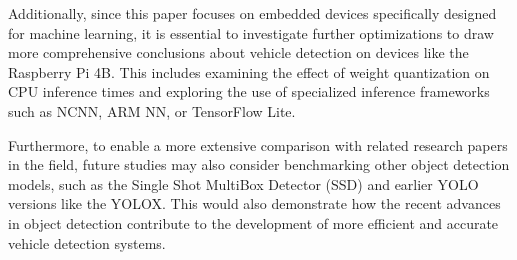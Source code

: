 Additionally, since this paper focuses on embedded devices specifically designed
for machine learning, it is essential to investigate further optimizations to
draw more comprehensive conclusions about vehicle detection on devices like the
Raspberry Pi 4B. This includes examining the effect of weight quantization on
CPU inference times and exploring the use of specialized inference frameworks
such as NCNN, ARM NN, or TensorFlow Lite.

Furthermore, to enable a more extensive comparison with related research papers
in the field, future studies may also consider benchmarking other object
detection models, such as the Single Shot MultiBox Detector (SSD) and earlier
YOLO versions like the YOLOX. This would also demonstrate how the recent
advances in object detection contribute to the development of more efficient and
accurate vehicle detection systems.





